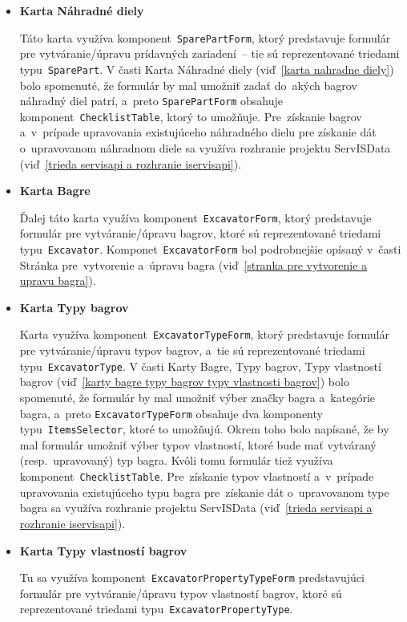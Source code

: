 \begin{itemize}
\item \textbf{Karta Náhradné diely}

Táto karta využíva komponent~\verb|SparePartForm|, ktorý predstavuje formulár pre vytváranie/úpravu prídavných zariadení~-- tie sú reprezentované triedami typu~\verb|SparePart|. V časti Karta Náhradné diely (viď~\ref{karta nahradne diely}) bolo spomenuté, že formulár by mal umožniť zadať do~akých bagrov náhradný diel patrí, a~preto \verb|SparePartForm| obsahuje komponent~\verb|ChecklistTable|, ktorý to umožňuje. Pre~získanie bagrov a~v~prípade upravovania existujúceho náhradného dielu pre získanie dát o~upravovanom náhradnom diele sa využíva rozhranie projektu ServISData (viď~\ref{trieda servisapi a rozhranie iservisapi}).

\item \textbf{Karta Bagre}

Ďalej táto karta využíva komponent~\verb|ExcavatorForm|, ktorý predstavuje formulár pre vytváranie/úpravu bagrov, ktoré sú reprezentované triedami typu~\verb|Excavator|. Komponet~\verb|ExcavatorForm| bol podrobnejšie opísaný v~časti Stránka pre~vytvorenie a~úpravu bagra (viď~\ref{stranka pre vytvorenie a upravu bagra}).

\item \textbf{Karta Typy bagrov}

Karta využíva komponent~\verb|ExcavatorTypeForm|, ktorý predstavuje formulár pre vytváranie/úpravu typov bagrov, a~tie sú reprezentované triedami typu~\verb|ExcavatorType|. V časti Karty Bagre, Typy bagrov, Typy vlastností bagrov (viď~\ref{karty bagre typy bagrov typy vlastnosti bagrov}) bolo spomenuté, že formulár by mal umožniť výber značky bagra a~kategórie bagra, a~preto \verb|ExcavatorTypeForm| obsahuje dva komponenty typu~\verb|ItemsSelector|, ktoré to umožňujú. Okrem toho bolo napísané, že by mal formulár umožniť výber typov vlastností, ktoré bude mať vytváraný (resp.~upravovaný) typ bagra. Kvôli tomu formulár tiež využíva komponent~\verb|ChecklistTable|. Pre~získanie typov vlastností a~v~prípade upravovania existujúceho typu bagra pre~získanie dát o~upravovanom type bagra sa využíva rozhranie projektu ServISData (viď~\ref{trieda servisapi a rozhranie iservisapi}).

\item \textbf{Karta Typy vlastností bagrov}

Tu sa využíva komponent~\verb|ExcavatorPropertyTypeForm| predstavujúci formulár pre vytváranie/úpravu typov vlastností bagrov, ktoré sú reprezentované triedami typu~\verb|ExcavatorPropertyType|.


\end{itemize}

